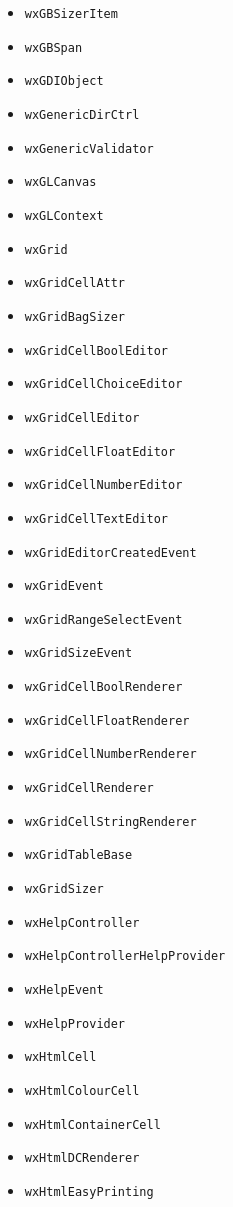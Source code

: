 \documentclass[a4paper,11pt,oneside,titlepage]{report}
\begin{document}
\begin{itemize}
\item \texttt{wxGBSizerItem}
\item \texttt{wxGBSpan}
\item \texttt{wxGDIObject}
\item \texttt{wxGenericDirCtrl}
\item \texttt{wxGenericValidator}
\item \texttt{wxGLCanvas}
\item \texttt{wxGLContext}
\item \texttt{wxGrid}
\item \texttt{wxGridCellAttr}
\item \texttt{wxGridBagSizer}
\item \texttt{wxGridCellBoolEditor}
\item \texttt{wxGridCellChoiceEditor}
\item \texttt{wxGridCellEditor}
\item \texttt{wxGridCellFloatEditor}
\item \texttt{wxGridCellNumberEditor}
\item \texttt{wxGridCellTextEditor}
\item \texttt{wxGridEditorCreatedEvent}
\item \texttt{wxGridEvent}
\item \texttt{wxGridRangeSelectEvent}
\item \texttt{wxGridSizeEvent}
\item \texttt{wxGridCellBoolRenderer}
\item \texttt{wxGridCellFloatRenderer}
\item \texttt{wxGridCellNumberRenderer}
\item \texttt{wxGridCellRenderer}
\item \texttt{wxGridCellStringRenderer}
\item \texttt{wxGridTableBase}
\item \texttt{wxGridSizer}
\item \texttt{wxHelpController}
\item \texttt{wxHelpControllerHelpProvider}
\item \texttt{wxHelpEvent}
\item \texttt{wxHelpProvider}
\item \texttt{wxHtmlCell}
\item \texttt{wxHtmlColourCell}
\item \texttt{wxHtmlContainerCell}
\item \texttt{wxHtmlDCRenderer}
\item \texttt{wxHtmlEasyPrinting}

\end{itemize}
\end{document}
